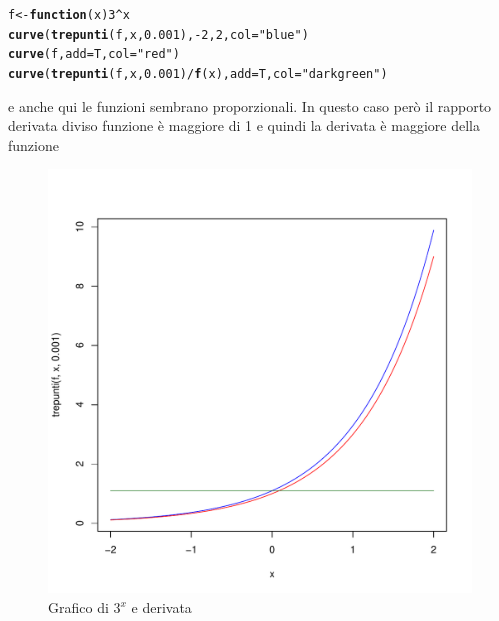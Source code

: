 \documentclass[onecolumn,11pt]{book}\usepackage[]{graphicx}\usepackage[]{color}
\makeatletter
\def\maxwidth{ %
  \ifdim\Gin@nat@width>\linewidth
    \linewidth
  \else
    \Gin@nat@width
  \fi
}
\newcommand{\hlnum}[1]{\textcolor[rgb]{0.686,0.059,0.569}{#1}}%
\newcommand{\hlstr}[1]{\textcolor[rgb]{0.192,0.494,0.8}{#1}}%
\newcommand{\hlopt}[1]{\textcolor[rgb]{0,0,0}{#1}}%
\newcommand{\hlstd}[1]{\textcolor[rgb]{0.345,0.345,0.345}{#1}}%
\newcommand{\hlkwa}[1]{\textcolor[rgb]{0.161,0.373,0.58}{\textbf{#1}}}%
\newcommand{\hlkwb}[1]{\textcolor[rgb]{0.69,0.353,0.396}{#1}}%
\newcommand{\hlkwc}[1]{\textcolor[rgb]{0.333,0.667,0.333}{#1}}%
\newcommand{\hlkwd}[1]{\textcolor[rgb]{0.737,0.353,0.396}{\textbf{#1}}}%
\newenvironment{kframe}{%
 \def\at@end@of@kframe{}%
 \ifinner\ifhmode%
  \def\at@end@of@kframe{\end{minipage}}%
  \begin{minipage}{\columnwidth}%
 \fi\fi%
 \def\FrameCommand##1{\hskip\@totalleftmargin \hskip-\fboxsep
 \colorbox{shadecolor}{##1}\hskip-\fboxsep
     \hskip-\linewidth \hskip-\@totalleftmargin \hskip\columnwidth}%
 \MakeFramed {\advance\hsize-\width
   \@totalleftmargin\z@ \linewidth\hsize
   \@setminipage}}%
 {\par\unskip\endMakeFramed%
 \at@end@of@kframe}
\newenvironment{knitrout}{}{} %
\makeatother
\begin{document}
\begin{knitrout}
\color{fgcolor}\begin{kframe}
\begin{alltt}
\hlstd{f}\hlkwb{<-}\hlkwa{function}\hlstd{(}\hlkwc{x}\hlstd{)} \hlnum{3}\hlopt{^}\hlstd{x}
\hlkwd{curve}\hlstd{(}\hlkwd{trepunti}\hlstd{(f,x,}\hlnum{0.001}\hlstd{),}\hlopt{-}\hlnum{2}\hlstd{,}\hlnum{2}\hlstd{,}\hlkwc{col}\hlstd{=}\hlstr{"blue"}\hlstd{)}
\hlkwd{curve}\hlstd{(f,}\hlkwc{add}\hlstd{=T,}\hlkwc{col}\hlstd{=}\hlstr{"red"}\hlstd{)}
\hlkwd{curve}\hlstd{(}\hlkwd{trepunti}\hlstd{(f,x,}\hlnum{0.001}\hlstd{)}\hlopt{/}\hlkwd{f}\hlstd{(x),}\hlkwc{add}\hlstd{=T,}\hlkwc{col}\hlstd{=}\hlstr{"dark green"}\hlstd{)}
\end{alltt}
\end{kframe}
\end{knitrout}
e anche qui  le funzioni sembrano proporzionali. In questo caso per\`o il rapporto derivata diviso funzione \`e  maggiore di 1 e quindi la derivata \`e maggiore della funzione
\begin{figure}[ htbp]
\begin{center}
\begin{knitrout}
\color{fgcolor}
\includegraphics[width=\maxwidth]{figure/unnamed-chunk-124-1} 

\end{knitrout}
\caption{Grafico di $3^x$ e derivata}
\label{fig:der3x}
\end{center}
\end{figure}
\end{document}
